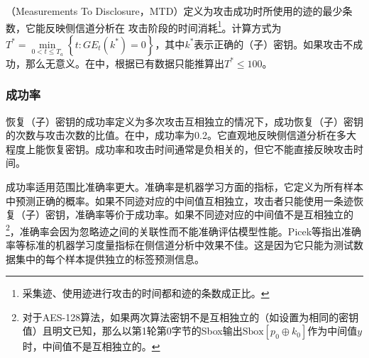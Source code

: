 {	\subsubsection{\chenggongtiaoshu }
	\chenggongtiaoshu \citep{Kim14}（Measurements To Disclosure，MTD）定义为攻击成功时所使用的迹的最少条数，它能反映侧信道分析在
	攻击阶段的时间消耗\footnote{采集迹、使用迹进行攻击的时间都和迹的条数成正比。}。\chenggongtiaoshu 计算方式为$T^*=\min\limits_{0<t\le T_a}\left\lbrace t:GE_t(k^*)=0 \right\rbrace $，其中$k^*$表示正确的（子）密钥。如果攻击不成功，那么\chenggongtiaoshu 无意义。在中，根据已有数据只能推算出$T^*\le100$。
	\subsubsection{成功率}
	恢复（子）密钥的成功率定义为多次攻击互相独立的情况下，成功恢复（子）密钥的次数与攻击次数的比值。在中，成功率为0.2。它直观地反映侧信道分析在多大程度上能恢复密钥。成功率和攻击时间通常是负相关的，但它不能直接反映攻击时间。
	
	成功率适用范围比准确率更大。准确率是机器学习方面的指标，它定义为所有样本中预测正确的概率。如果不同迹对应的中间值互相独立，攻击者只能使用一条迹恢复（子）密钥，准确率等价于成功率。如果不同迹对应的中间值不是互相独立的\footnote{对于AES-128算法，如果两次算法密钥不是互相独立的（如设置为相同的密钥值）且明文已知，那么以第1轮第0字节的Sbox输出$\mathrm{Sbox}[p_0\oplus k_0]$作为中间值$y$时，中间值不是互相独立的。}，准确率会因为忽略迹之间的关联性而不能准确评估模型性能。Picek等\citep{Picek19}指出准确率等标准的机器学习度量指标在侧信道分析中效果不佳。这是因为它只能为测试数据集中的每个样本提供独立的标签预测信息。
	{\color{\xchange}
		
%	
%	
	
}}
